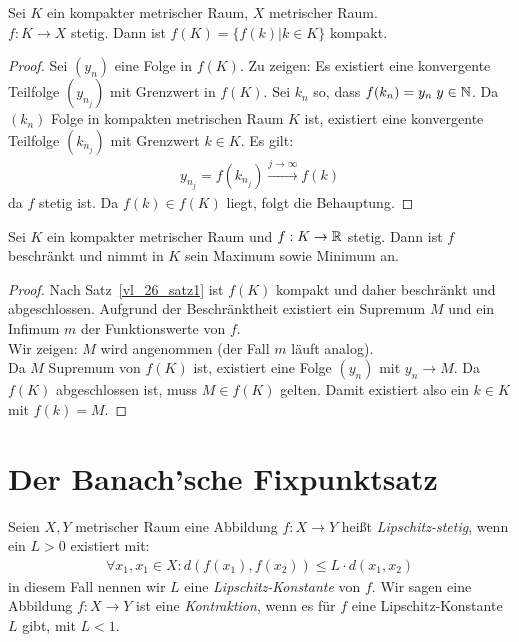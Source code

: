 \begin{Satz}\label{vl_26_satz1}%
	Sei $K$ ein kompakter metrischer Raum, $X$ metrischer Raum. \\
	$f: K \rightarrow X$ 
	stetig. Dann ist $f(K) = \{f(k)\vert k \in K\}$ kompakt.
\end{Satz}

\begin{proof}
	Sei $(y_n)$ eine Folge in $f(K)$. Zu zeigen: Es existiert eine konvergente 
	Teilfolge $(y_{n_j})$ mit Grenzwert in $f(K)$. Sei $k_n$ so, dass $f(k_n) 
	= y_n \; y \in \mathbb{N}$. Da $(k_n)$ Folge in kompakten metrischen Raum $K$ ist, 
	existiert eine konvergente Teilfolge $(k_{n_j})$ mit Grenzwert $k \in K$. Es 
	gilt: 
	\begin{align*}
		y_{n_j} = f(k_{n_j}) \xrightarrow{j \rightarrow \infty} f(k)
	\end{align*}
	da $f$ stetig ist. Da $f(k) \in f(K)$ liegt, folgt die Behauptung.
\end{proof}

\begin{Korollar}%
	Sei $K$ ein kompakter metrischer Raum und $f: K \rightarrow \mathbb{R}$ stetig. 
	Dann ist $f$ beschränkt und nimmt in $K$ sein Maximum sowie Minimum an.
\end{Korollar}

\begin{proof}
	Nach Satz~\ref{vl_26_satz1} ist $f(K)$ kompakt und daher beschränkt und 
	abgeschlossen. Aufgrund der Beschränktheit existiert ein Supremum $M$ und 
	ein Infimum $m$ der Funktionswerte von $f$. \\
	Wir zeigen: $M$ wird angenommen (der Fall $m$ läuft analog).\\
	Da $M$ Supremum von $f(K)$ ist, existiert eine Folge $(y_n)$ mit 
	$y_n \rightarrow M$. Da $f(K)$ abgeschlossen ist, muss $M \in f(K)$ gelten. 
	Damit existiert also ein $k \in K$ mit $f(k) = M$. 
\end{proof}

\section{Der Banach'sche Fixpunktsatz}

\begin{Definition}%
	Seien $X,Y$ metrischer Raum eine Abbildung $f: X \rightarrow Y$ heißt 
	\emph{Lipschitz-stetig}, wenn ein $L > 0$ existiert mit:
	\begin{align*}
		\forall x_1, x_1 \in X: d(f(x_1),f(x_2)) \leq L \cdot d(x_1,x_2)
	\end{align*}
	in diesem Fall nennen wir $L$ eine \emph{Lipschitz-Konstante} von $f$.
	Wir sagen eine Abbildung $f: X \rightarrow Y$ ist eine \emph{Kontraktion}, 
	wenn es für $f$ eine Lipschitz-Konstante $L$ gibt, mit $L < 1$.
\end{Definition}

